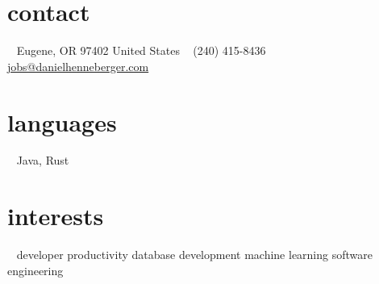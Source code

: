 \documentclass[]{friggeri-cv} %
\begin{document}


\begin{aside} %
\section{contact}
~
Eugene, OR 97402
United States
~
(240) 415-8436
~
{\fontsize{8pt}{10pt}\selectfont\href{mailto:jobs@danielhenneberger.com}{jobs@danielhenneberger.com}}
\section{languages}
~
Java, Rust
\section{interests}
~
developer productivity
database development
machine learning
software engineering
\end{aside}

\end{document}
